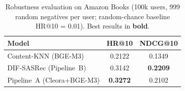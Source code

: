 \begin{table}[H]
\caption{Robustness evaluation on Amazon Books (100k users, 999 random
         negatives per user; random-chance baseline HR@10 = 0.01).
         Best results in \textbf{bold}.}
\label{tab:robustness}
\centering
\begin{tabular}{lcc}
\toprule
\textbf{Model} & \textbf{HR@10} & \textbf{NDCG@10} \\
\midrule
Content-KNN (BGE-M3)       & 0.2122          & 0.1349          \\
DIF-SASRec (Pipeline~B)    & 0.3142          & \textbf{0.2209} \\
Pipeline~A (Cleora+BGE-M3) & \textbf{0.3272} & 0.2102          \\
\bottomrule
\end{tabular}
\end{table}
